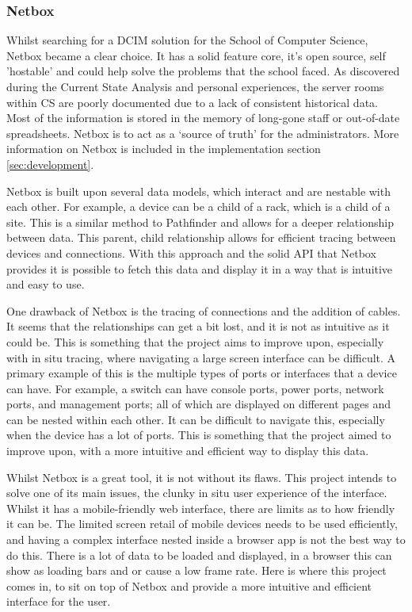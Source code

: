 \documentclass [11pt,a4paper]{article}
\begin{document}
\pagebreak

\subsubsection{Netbox}
\label{sec:netbox}

Whilst searching for a DCIM solution for the School of Computer Science, Netbox became a clear choice. It has a solid feature core, it's open source, self 'hostable' and could help solve the problems that the school faced. As discovered during the Current State Analysis and personal experiences, the server rooms within CS are poorly documented due to a lack of consistent historical data. Most of the information is stored in the memory of long-gone staff or out-of-date spreadsheets. Netbox is to act as a `source of truth'\cite{Netbox} for the administrators. More information on Netbox is included in the implementation section \ref{sec:development}. 

Netbox is built upon several data models, which interact and are nestable with each other. For example, a device can be a child of a rack, which is a child of a site. This is a similar method to Pathfinder and allows for a deeper relationship between data. This parent, child relationship allows for efficient tracing between devices and connections. With this approach and the solid API that Netbox provides it is possible to fetch this data and display it in a way that is intuitive and easy to use. 

One drawback of Netbox is the tracing of connections and the addition of cables. It seems that the relationships can get a bit lost, and it is not as intuitive as it could be. This is something that the project aims to improve upon, especially with in situ tracing, where navigating a large screen interface can be difficult. A primary example of this is the multiple types of ports or interfaces that a device can have. For example, a switch can have console ports, power ports, network ports, and management ports; all of which are displayed on different pages and can be nested within each other. It can be difficult to navigate this, especially when the device has a lot of ports. This is something that the project aimed to improve upon, with a more intuitive and efficient way to display this data.

Whilst Netbox is a great tool, it is not without its flaws. This project intends to solve one of its main issues, the clunky in situ user experience of the interface. Whilst it has a mobile-friendly web interface, there are limits as to how friendly it can be. The limited screen retail of mobile devices needs to be used efficiently, and having a complex interface nested inside a browser app is not the best way to do this. There is a lot of data to be loaded and displayed, in a browser this can show as loading bars and or cause a low frame rate. Here is where this project comes in, to sit on top of Netbox and provide a more intuitive and efficient interface for the user.  
\end{document}
